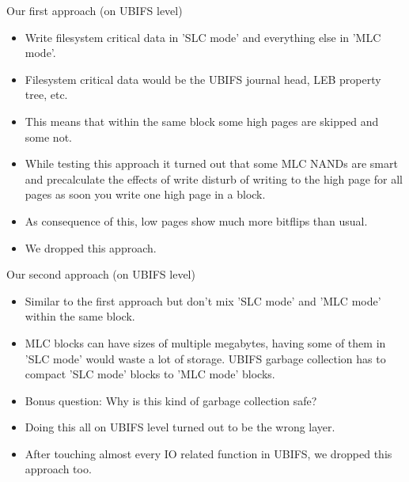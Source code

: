\documentclass[aspectratio=169,obeyspaces,spaces,hyphens,dvipsnames]{beamer}
\begin{document}
\begin{frame}{Our first approach (on UBIFS level)}
  \begin{itemize}
  \item Write filesystem critical data in 'SLC mode' and everything else in 'MLC mode'.
  \item Filesystem critical data would be the UBIFS journal head, LEB property tree, etc.
  \item This means that within the same block some high pages are skipped and some not.
  \item While testing this approach it turned out that some MLC NANDs are smart and
        precalculate the effects of write disturb of writing to the high page for all
        pages as soon you write one high page in a block.
  \item As consequence of this, low pages show much more bitflips than usual.
  \item We dropped this approach.
  \end{itemize}
\end{frame}

\begin{frame}{Our second approach (on UBIFS level)}
  \begin{itemize}
  \item Similar to the first approach but don't mix 'SLC mode' and 'MLC mode' within the same
        block.
  \item MLC blocks can have sizes of multiple megabytes, having some of them in 'SLC mode' would
        waste a lot of storage. UBIFS garbage collection has to compact 'SLC mode' blocks to 'MLC mode'
        blocks.
  \item Bonus question: Why is this kind of garbage collection safe?
  \item Doing this all on UBIFS level turned out to be the wrong layer.
  \item After touching almost every IO related function in UBIFS, we dropped this approach too.
  \end{itemize}
\end{frame}
\end{document}
